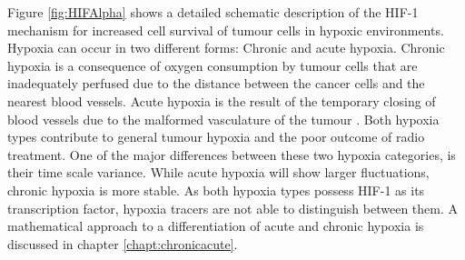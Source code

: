 Figure \ref{fig:HIFAlpha} shows a detailed schematic description of the HIF-1 mechanism for increased cell survival of tumour cells in hypoxic environments. Hypoxia can occur in two different forms: Chronic and acute hypoxia. Chronic hypoxia is a consequence of oxygen consumption by tumour cells that are inadequately perfused due to the distance between the cancer cells and the nearest blood vessels. Acute hypoxia is the result of the temporary closing of blood vessels due to the malformed vasculature of the tumour \cite{Simon}. Both hypoxia types contribute to general tumour hypoxia and the poor outcome of radio treatment. One of the major differences between these two hypoxia categories, is their time scale variance. While acute hypoxia will show larger fluctuations, chronic hypoxia is more stable. As both hypoxia types possess HIF-1 as its transcription factor, hypoxia tracers are not able to distinguish between them. A mathematical approach to a differentiation of acute and chronic hypoxia is discussed in chapter \ref{chapt:chronicacute}.
